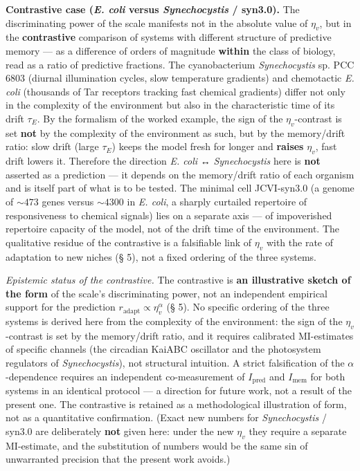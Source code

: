 \documentclass[pdflatex,sn-mathphys-ay]{sn-jnl}
\begin{document}
\textbf{Contrastive case (\emph{E. coli} versus \emph{Synechocystis} / syn3.0).} The discriminating power of the scale manifests not in the absolute value of \(\eta_v\), but in the \textbf{contrastive} comparison of systems with different structure of predictive memory --- as a difference of orders of magnitude \textbf{within} the class of biology, read as a ratio of predictive fractions. The cyanobacterium \emph{Synechocystis} sp. PCC 6803 (diurnal illumination cycles, slow temperature gradients) and chemotactic \emph{E. coli} (thousands of Tar receptors tracking fast chemical gradients) differ not only in the complexity of the environment but also in the characteristic time of its drift \(\tau_E\). By the formalism of the worked example, the sign of the \(\eta_v\)-contrast is set \textbf{not} by the complexity of the environment as such, but by the memory/drift ratio: slow drift (large \(\tau_E\)) keeps the model fresh for longer and \textbf{raises} \(\eta_v\), fast drift lowers it. Therefore the direction \emph{E. coli} ↔ \emph{Synechocystis} here is \textbf{not} asserted as a prediction --- it depends on the memory/drift ratio of each organism and is itself part of what is to be tested. The minimal cell JCVI-syn3.0 (a genome of \(\sim 473\) genes versus \(\sim 4300\) in \emph{E. coli}, a sharply curtailed repertoire of responsiveness to chemical signals) lies on a separate axis --- of impoverished repertoire capacity of the model, not of the drift time of the environment. The qualitative residue of the contrastive is a falsifiable link of \(\eta_v\) with the rate of adaptation to new niches (§ 5), not a fixed ordering of the three systems.

\emph{Epistemic status of the contrastive.} The contrastive is \textbf{an illustrative sketch of the form} of the scale's discriminating power, not an independent empirical support for the prediction \(r_{\text{adapt}} \propto \eta_v^{\alpha}\) (§ 5). No specific ordering of the three systems is derived here from the complexity of the environment: the sign of the \(\eta_v\)-contrast is set by the memory/drift ratio, and it requires calibrated MI-estimates of specific channels (the circadian KaiABC oscillator and the photosystem regulators of \emph{Synechocystis}), not structural intuition. A strict falsification of the \(\alpha\)-dependence requires an independent co-measurement of \(I_{\text{pred}}\) and \(I_{\text{mem}}\) for both systems in an identical protocol --- a direction for future work, not a result of the present one. The contrastive is retained as a methodological illustration of form, not as a quantitative confirmation. (Exact new numbers for \emph{Synechocystis} / syn3.0 are deliberately \textbf{not} given here: under the new \(\eta_v\) they require a separate MI-estimate, and the substitution of numbers would be the same sin of unwarranted precision that the present work avoids.)
\end{document}
